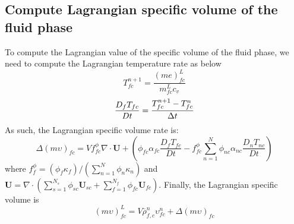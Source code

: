 \documentclass[preprint,12pt]{elsarticle}
\begin{document}
\subsection{\textsf{Compute Lagrangian specific volume of the fluid phase}}
To compute the Lagrangian value of the specific volume of the fluid phase, we need to compute the Lagrangian temperature rate as below
%
%
\begin{equation}
 T_{fc}^{n+1} = \frac{(me)_{fc}^L}{m_{fc}^L c_v}
\end {equation}
%
%
\begin{equation}
 \frac{D_f T_{fc}}{Dt} =  \frac{T_{fc}^{n+1} - T_{fc}^{n}}{\Delta{t}}
\end {equation}
%
%
As such, the Lagrangian specific volume rate is:
%
%
\begin{equation}
 \Delta (m \upsilon)_{fc} = V f_{fc}^{\phi} \nabla \cdot \pmb{U} + (\phi_{fc} \alpha_{fc} \frac{D_f T_{fc}}{Dt} - f_{fc}^{\phi} \sum_{n=1}^{N} \phi_{nc} \alpha_{nc} \frac{D_n T_{nc}}{Dt})
\end {equation}
%
%
where $ f_f^{\phi} = (\phi_f  \kappa_f ) / (\sum_{n=1}^{N} \phi_n \kappa_n)$ and  $\pmb{U} = \nabla \cdot (\sum_{s=1}^{N_s} \phi_{sc} \pmb{U}_{sc} + \sum_{f=1}^{N_f}  \phi_{fc} \pmb{U}_{fc})$.
%
%
Finally, the Lagrangian specific volume is
\begin{equation}
 (m \upsilon)_{fc}^L = V \overline{\rho}_{f,c}^n \upsilon_{fc}^n + \Delta (m\upsilon)_{fc} 
\end {equation}
%
%
\end{document}
